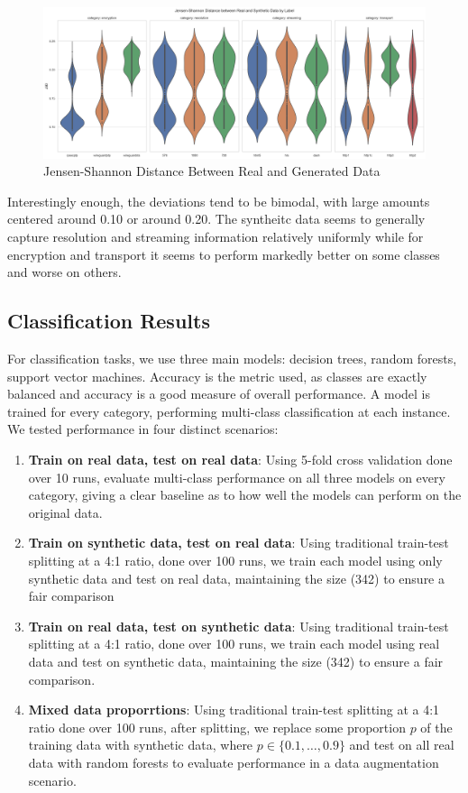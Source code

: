 \documentclass[sigconf, nonacm]{acmart}
\begin{document}
\begin{figure}[htbp]
\includegraphics[width=1\textwidth]{../src/evaluation/figures/jsd_violin.png}
\caption{Jensen-Shannon Distance Between Real and Generated Data}
\label{fig:jsd_violin}
\end{figure}
\FloatBarrier

Interestingly enough, the deviations tend to be bimodal, with large amounts
centered around 0.10 or around 0.20. The syntheitc data seems to generally capture
resolution and streaming information relatively uniformly while for encryption and transport
it seems to perform markedly better on some classes and worse on others.

\subsection{Classification Results}
For classification tasks, we use three main models: decision trees, random forests,
support vector machines. Accuracy is the metric used, as classes are exactly balanced
and accuracy is a good measure of overall performance. A model is trained for every 
category, performing multi-class classification at each instance. We tested performance
in four distinct scenarios:

\begin{enumerate}
  \item \textbf{Train on real data, test on real data}:
  Using 5-fold cross validation done over 10 runs, 
  evaluate multi-class performance on all three models on every category, giving
  a clear baseline as to how well the models can perform on the original data.
  \item \textbf{Train on synthetic data, test on real data}: Using traditional 
  train-test splitting at a 4:1 ratio,
  done over 100 runs, we train each model using only synthetic data and test on real
  data, maintaining the size (342) to ensure a fair comparison
  \item \textbf{Train on real data, test on synthetic data}: Using traditional 
  train-test splitting at a 4:1 ratio, done over 100 runs, we train each model using real
  data and test on synthetic data, maintaining the size (342) to ensure a fair comparison.
  \item \textbf{Mixed data proporrtions}: Using traditional train-test splitting at a 4:1 ratio
  done over 100 runs, after splitting, we replace some proportion $p$ of the training
  data with synthetic data, where $p \in \{0.1, \ldots, 0.9\}$ and test on all real 
  data with random forests to evaluate performance in a data augmentation scenario.
\end{enumerate}
\end{document}
